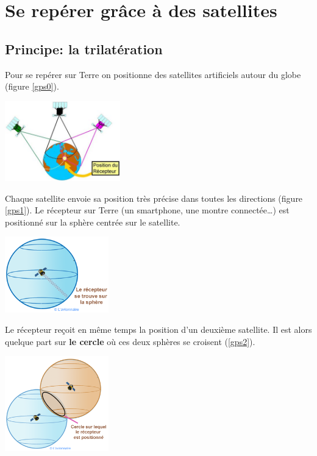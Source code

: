 \documentclass[a4paper,11pt]{article}
\begin{document}
\section{Se repérer grâce à des satellites}
\subsection{Principe: la trilatération}
Pour se repérer sur Terre on positionne des satellites artificiels autour du globe (figure \ref{gps0}).
\begin{center}
    \centering
    \includegraphics[width=5cm]{ressources/gps0.jpg}
    \label{gps0}
\end{center}
Chaque satellite envoie sa position très précise dans toutes les directions (figure \ref{gps1}). Le récepteur sur Terre (un smartphone, une montre connectée\dots) est positionné sur la sphère centrée sur le satellite.
\begin{center}
    \centering
    \includegraphics[width=4.5cm]{ressources/gps1.png}

    \label{gps1}
\end{center}
Le récepteur reçoit en même temps la position d'un deuxième satellite. Il est alors quelque part sur \textbf{le cercle} où ces deux sphères se croisent (\ref{gps2}).
\begin{center}
    \centering
    \includegraphics[width=4.5cm]{ressources/gps2.png}

    \label{gps2}
\end{center}
\end{document}
